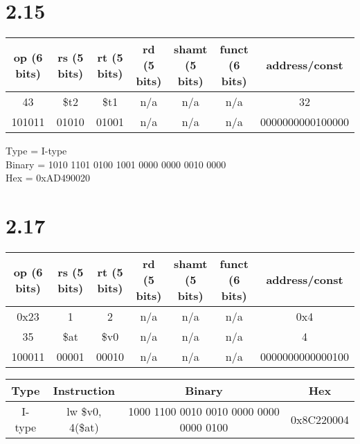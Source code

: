 \documentclass[12pt]{article}
\begin{document}
\section*{2.15}
\begin{tabular}{|c|c|c|c|c|c|c|}
	\hline
	op (6 bits) & rs (5 bits) & rt (5 bits) & rd (5 bits) & shamt (5 bits) & funct (6 bits) & address/const\\
	\hline
	43 & \$t2 & \$t1 & n/a & n/a & n/a & 32\\
	\hline
	101011 & 01010 & 01001 & n/a & n/a & n/a & 0000000000100000\\
	\hline
\end{tabular}
\newline
\newline
Type = I-type\\
Binary = 1010 1101 0100 1001 0000 0000 0010 0000\\
Hex = 0xAD490020

\section*{2.17}
\begin{tabular}{|c|c|c|c|c|c|c|}
	\hline
	op (6 bits) & rs (5 bits) & rt (5 bits) & rd (5 bits) & shamt (5 bits) & funct (6 bits) & address/const\\
	\hline
	0x23 & 1 & 2 & n/a & n/a & n/a & 0x4\\
	\hline
	35 & \$at & \$v0 & n/a & n/a & n/a & 4\\
	\hline
	100011 & 00001 & 00010 & n/a & n/a & n/a & 0000000000000100\\
	\hline
\end{tabular}
\newline
\vspace{4mm}
\newline
\begin{tabular}{|c|c|c|c|}
	\hline
	Type & Instruction & Binary & Hex\\
	\hline
	I-type & lw \$v0, 4(\$at) & 1000 1100 0010 0010 0000 0000 0000 0100 & 0x8C220004\\
	\hline
\end{tabular}
\end{document}
